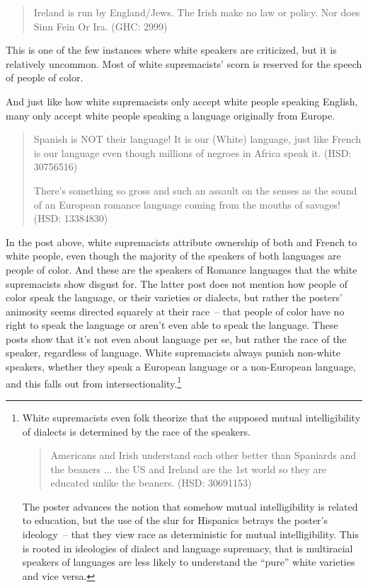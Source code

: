 \documentclass[output=paper,colorlinks,citecolor=brown]{langscibook}
\begin{document}
\begin{quote} 
Ireland is run by England/Jews. The Irish make no law or policy. Nor does Sinn Fein Or Ira. (GHC: 2999) 
\end{quote}

\noindent This is one of the few instances where white speakers are criticized, but it is relatively uncommon. Most of white supremacists' scorn is reserved for the speech of people of color.

And just like how white supremacists only accept white people speaking English, many only accept white people speaking a language originally from Europe.

\begin{quote} 
Spanish is NOT their language! It is our (White) language, just like French is our language even though millions of negroes in Africa speak it. (HSD: 30756516)

There's something so gross and such an assault on the senses as the sound of an European romance language coming from the mouths of savages! (HSD: 13384830) 
\end{quote}

\noindent In the post above, white supremacists attribute ownership of both  and  French to white people, even though the majority of the speakers of both languages are people of color. And these are the speakers of Romance languages that the white supremacists show disgust for. The latter post does not mention how people of color speak the language, or their varieties or dialects, but rather the posters' animosity seems directed squarely at their race~-- that people of color have no right to speak the language or aren't even able to speak the language. These posts show that it's not even about language per se, but rather the race of the speaker, regardless of language. White supremacists always punish non-white speakers, whether they speak a European language or a non\hyp European language, and this falls out from intersectionality.\footnote{White supremacists even folk theorize that the supposed mutual intelligibility of dialects is determined by the race of the speakers.

\begin{quote}
Americans and Irish understand each other better than Spaniards and the beaners ... the US and Ireland are the 1st world so they are educated unlike the beaners. (HSD: 30691153) 
\end{quote}

\noindent The poster advances the notion that somehow mutual intelligibility is related to education, but the use of the slur for Hispanics betrays the poster's ideology~-- that they view race as deterministic for mutual intelligibility. This is rooted in ideologies of dialect and language supremacy, that is multiracial speakers of languages are less likely to understand the “pure” white varieties and vice versa.}
\end{document}
